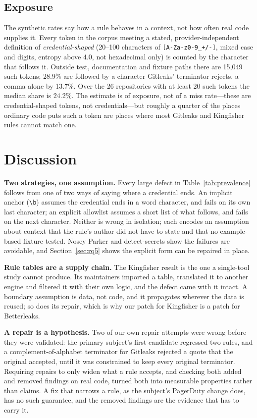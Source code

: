 \documentclass[10pt,journal,compsoc]{IEEEtran}
\begin{document}
\subsection{Exposure}

The synthetic rates say how a rule behaves in a context, not how often real code supplies it. Every token in the corpus meeting a stated, provider-independent definition of \emph{credential-shaped} (20--100 characters of \texttt{[A-Za-z0-9\_+/-]}, mixed case and digits, entropy above 4.0, not hexadecimal only) is counted by the character that follows it. Outside test, documentation and fixture paths there are 15{,}049 such tokens; 28.9\% are followed by a character Gitleaks' terminator rejects, a comma alone by 13.7\%. Over the 26 repositories with at least 20 such tokens the median share is 24.2\%. The estimate is of exposure, not of a miss rate---these are credential-shaped tokens, not credentials---but roughly a quarter of the places ordinary code puts such a token are places where most Gitleaks and Kingfisher rules cannot match one.

\section{Discussion}
\label{sec:discussion}

\textbf{Two strategies, one assumption.} Every large defect in Table~\ref{tab:prevalence} follows from one of two ways of saying where a credential ends. An implicit anchor (\verb|\b|) assumes the credential ends in a word character, and fails on its own last character; an explicit allowlist assumes a short list of what follows, and fails on the next character. Neither is wrong in isolation; each encodes an assumption about context that the rule's author did not have to state and that no example-based fixture tested. Nosey Parker and detect-secrets show the failures are avoidable, and Section~\ref{sec:rq5} shows the explicit form can be repaired in place.

\textbf{Rule tables are a supply chain.} The Kingfisher result is the one a single-tool study cannot produce. Its maintainers imported a table, translated it to another engine and filtered it with their own logic, and the defect came with it intact. A boundary assumption is data, not code, and it propagates wherever the data is reused; so does its repair, which is why our patch for Kingfisher is a patch for Betterleaks.

\textbf{A repair is a hypothesis.} Two of our own repair attempts were wrong before they were validated: the primary subject's first candidate regressed two rules, and a complement-of-alphabet terminator for Gitleaks rejected a quote that the original accepted, until it was constrained to keep every original terminator. Requiring repairs to only widen what a rule accepts, and checking both added and removed findings on real code, turned both into measurable properties rather than claims. A fix that narrows a rule, as the subject's PagerDuty change does, has no such guarantee, and the removed findings are the evidence that has to carry it.
\end{document}
